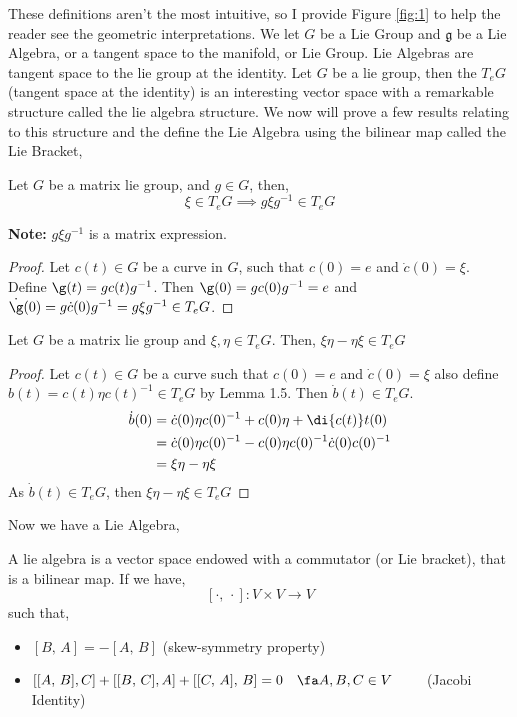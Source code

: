 \noindent
These definitions aren't the most intuitive, so I provide Figure \ref{fig:1} to help the reader see the geometric interpretations. We let $G$ be a Lie Group and $\mathfrak{g}$ be a Lie Algebra, or a tangent space to the manifold, or Lie Group. Lie Algebras are tangent space to the lie group at the identity. Let $G$ be a lie group, then the $T_e G$ (tangent space at the identity) is an interesting vector space with a remarkable structure called the lie algebra structure. We now will prove a few results relating to this structure and the define the Lie Algebra using the bilinear map called the Lie Bracket,

\begin{nlemma}
  Let $G$ be a matrix lie group, and $g \in G$, then,
  $$ \xi \in T_eG \implies g\xi g^{-1} \in T_eG $$
\end{nlemma}
\noindent
\textbf{Note:} $g \xi g^{-1}$ is a matrix expression.\\

\begin{proof}
  Let $c(t) \in G$ be a curve in $G$, such that $c(0) = e$ and $\dot c (0) = \xi$. Define $\g (t) = gc(t)g^{-1}$. Then $\g(0) = g c(0) g^{-1} = e$ and $\dot\g (0) = g \dot c (0) g^{-1} = g\xi g^{-1} \in T_e G$.
\end{proof}

\begin{nprop}
  Let $G$ be a matrix lie group and $\xi, \eta \in T_eG$. Then, $\xi\eta - \eta\xi \in T_eG$
\end{nprop}
\begin{proof}
  Let $c(t) \in G$ be a curve such that $c(0) = e$ and $\dot c(0) = \xi$ also define $b(t) = c(t)\eta c(t)^{-1} \in T_eG$ by Lemma 1.5. Then $\dot b(t) \in T_eG$.
  \begin{align*}
    \dot b(0) &= \dot c(0)\eta c(0)^{-1} + c(0)\eta + \di {c(t)} t (0)\\
    &= \dot c(0)\eta c(0)^{-1} - c(0)\eta c(0)^{-1}\dot c(0) c(0)^{-1}\\
    &= \xi \eta - \eta\xi
  \end{align*}
  As $\dot b(t) \in T_eG$, then $\xi \eta - \eta\xi \in T_eG$
\end{proof}

\noindent
Now we have a Lie Algebra,
\begin{ndefi}
  A lie algebra is a vector space endowed with a {commutator }(or Lie bracket), that is a bilinear map. If we have,
  $$ [\cdot,\, \cdot] : V \times V \to V $$
  such that,
  \begin{itemize}
    \item $[B,\, A] = - [A,\, B]$ (skew-symmetry property)
    \item $[[A,\, B], C] + [[B,\, C], A] + [[C,\, A],\, B] = 0 \quad \fa A, B, C \in V \qquad$ (Jacobi Identity)
  \end{itemize}
\end{ndefi}

